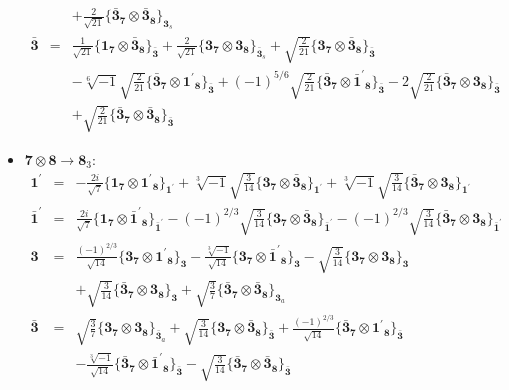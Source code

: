 \documentclass[english]{article}
\newcommand{\subcg}[3]{\big\{ {#1}\otimes{#2}\big\}^{}_{#3}}
\newcommand{\rep}[1]{\mathbf{#1}}
\begin{document}
\begin{itemize}
\begin{eqnarray*}
 & & +\frac{2}{\sqrt{21}}\subcg{\rep{\bar{3}}_{\rep{7}}}{\rep{\bar{3}}_{\rep{8}}}{\rep{3}_{s}}
\\
\rep{\bar{3}} &=& \frac{1}{\sqrt{21}}\subcg{\rep{1}_{\rep{7}}}{\rep{\bar{3}}_{\rep{8}}}{\rep{\bar{3}}}+\frac{2}{\sqrt{21}}\subcg{\rep{3}_{\rep{7}}}{\rep{3}_{\rep{8}}}{\rep{\bar{3}}_{s}}+\sqrt{\frac{2}{21}}\subcg{\rep{3}_{\rep{7}}}{\rep{\bar{3}}_{\rep{8}}}{\rep{\bar{3}}} \\ 
 & & -\sqrt[6]{-1} \sqrt{\frac{2}{21}}\subcg{\rep{\bar{3}}_{\rep{7}}}{\rep{1^{\prime}}_{\rep{8}}}{\rep{\bar{3}}}+(-1)^{5/6} \sqrt{\frac{2}{21}}\subcg{\rep{\bar{3}}_{\rep{7}}}{\rep{\bar{1}^{\prime}}_{\rep{8}}}{\rep{\bar{3}}}-2 \sqrt{\frac{2}{21}}\subcg{\rep{\bar{3}}_{\rep{7}}}{\rep{3}_{\rep{8}}}{\rep{\bar{3}}} \\ 
 & & +\sqrt{\frac{2}{21}}\subcg{\rep{\bar{3}}_{\rep{7}}}{\rep{\bar{3}}_{\rep{8}}}{\rep{\bar{3}}}
\end{eqnarray*}
\item $\rep{7}\otimes\rep{8}\to\rep{8}_{3}$:
\begin{eqnarray*}
\rep{1^{\prime}} &=& -\frac{2 i}{\sqrt{7}}\subcg{\rep{1}_{\rep{7}}}{\rep{1^{\prime}}_{\rep{8}}}{\rep{1^{\prime}}}+\sqrt[3]{-1} \sqrt{\frac{3}{14}}\subcg{\rep{3}_{\rep{7}}}{\rep{\bar{3}}_{\rep{8}}}{\rep{1^{\prime}}}+\sqrt[3]{-1} \sqrt{\frac{3}{14}}\subcg{\rep{\bar{3}}_{\rep{7}}}{\rep{3}_{\rep{8}}}{\rep{1^{\prime}}}
\\
\rep{\bar{1}^{\prime}} &=& \frac{2 i}{\sqrt{7}}\subcg{\rep{1}_{\rep{7}}}{\rep{\bar{1}^{\prime}}_{\rep{8}}}{\rep{\bar{1}^{\prime}}}-(-1)^{2/3} \sqrt{\frac{3}{14}}\subcg{\rep{3}_{\rep{7}}}{\rep{\bar{3}}_{\rep{8}}}{\rep{\bar{1}^{\prime}}}-(-1)^{2/3} \sqrt{\frac{3}{14}}\subcg{\rep{\bar{3}}_{\rep{7}}}{\rep{3}_{\rep{8}}}{\rep{\bar{1}^{\prime}}}
\\
\rep{3} &=& \frac{(-1)^{2/3}}{\sqrt{14}}\subcg{\rep{3}_{\rep{7}}}{\rep{1^{\prime}}_{\rep{8}}}{\rep{3}}-\frac{\sqrt[3]{-1}}{\sqrt{14}}\subcg{\rep{3}_{\rep{7}}}{\rep{\bar{1}^{\prime}}_{\rep{8}}}{\rep{3}}-\sqrt{\frac{3}{14}}\subcg{\rep{3}_{\rep{7}}}{\rep{3}_{\rep{8}}}{\rep{3}} \\ 
 & & +\sqrt{\frac{3}{14}}\subcg{\rep{\bar{3}}_{\rep{7}}}{\rep{3}_{\rep{8}}}{\rep{3}}+\sqrt{\frac{3}{7}}\subcg{\rep{\bar{3}}_{\rep{7}}}{\rep{\bar{3}}_{\rep{8}}}{\rep{3}_{a}}
\\
\rep{\bar{3}} &=& \sqrt{\frac{3}{7}}\subcg{\rep{3}_{\rep{7}}}{\rep{3}_{\rep{8}}}{\rep{\bar{3}}_{a}}+\sqrt{\frac{3}{14}}\subcg{\rep{3}_{\rep{7}}}{\rep{\bar{3}}_{\rep{8}}}{\rep{\bar{3}}}+\frac{(-1)^{2/3}}{\sqrt{14}}\subcg{\rep{\bar{3}}_{\rep{7}}}{\rep{1^{\prime}}_{\rep{8}}}{\rep{\bar{3}}} \\ 
 & & -\frac{\sqrt[3]{-1}}{\sqrt{14}}\subcg{\rep{\bar{3}}_{\rep{7}}}{\rep{\bar{1}^{\prime}}_{\rep{8}}}{\rep{\bar{3}}}-\sqrt{\frac{3}{14}}\subcg{\rep{\bar{3}}_{\rep{7}}}{\rep{\bar{3}}_{\rep{8}}}{\rep{\bar{3}}}
\end{eqnarray*}
\end{itemize}
\end{document}
